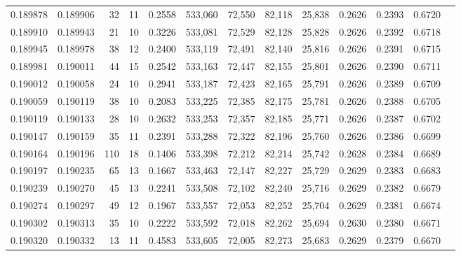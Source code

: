 \begin{tabular}{rrrrrrrrrrrrr}
0.189878 & 0.189906 &    32 &  11 &                                     0.2558 & 533,060 &  72,550 &  82,118 &  25,838 & 0.2626 & 0.2393 & 0.6720 \\
0.189910 & 0.189943 &    21 &  10 &                                     0.3226 & 533,081 &  72,529 &  82,128 &  25,828 & 0.2626 & 0.2392 & 0.6718 \\
0.189945 & 0.189978 &    38 &  12 &                                     0.2400 & 533,119 &  72,491 &  82,140 &  25,816 & 0.2626 & 0.2391 & 0.6715 \\
0.189981 & 0.190011 &    44 &  15 &                                     0.2542 & 533,163 &  72,447 &  82,155 &  25,801 & 0.2626 & 0.2390 & 0.6711 \\
0.190012 & 0.190058 &    24 &  10 &                                     0.2941 & 533,187 &  72,423 &  82,165 &  25,791 & 0.2626 & 0.2389 & 0.6709 \\
0.190059 & 0.190119 &    38 &  10 &                                     0.2083 & 533,225 &  72,385 &  82,175 &  25,781 & 0.2626 & 0.2388 & 0.6705 \\
0.190119 & 0.190133 &    28 &  10 &                                     0.2632 & 533,253 &  72,357 &  82,185 &  25,771 & 0.2626 & 0.2387 & 0.6702 \\
0.190147 & 0.190159 &    35 &  11 &                                     0.2391 & 533,288 &  72,322 &  82,196 &  25,760 & 0.2626 & 0.2386 & 0.6699 \\
0.190164 & 0.190196 &   110 &  18 &                                     0.1406 & 533,398 &  72,212 &  82,214 &  25,742 & 0.2628 & 0.2384 & 0.6689 \\
0.190197 & 0.190235 &    65 &  13 &                                     0.1667 & 533,463 &  72,147 &  82,227 &  25,729 & 0.2629 & 0.2383 & 0.6683 \\
0.190239 & 0.190270 &    45 &  13 &                                     0.2241 & 533,508 &  72,102 &  82,240 &  25,716 & 0.2629 & 0.2382 & 0.6679 \\
0.190274 & 0.190297 &    49 &  12 &                                     0.1967 & 533,557 &  72,053 &  82,252 &  25,704 & 0.2629 & 0.2381 & 0.6674 \\
0.190302 & 0.190313 &    35 &  10 &                                     0.2222 & 533,592 &  72,018 &  82,262 &  25,694 & 0.2630 & 0.2380 & 0.6671 \\
0.190320 & 0.190332 &    13 &  11 &                                     0.4583 & 533,605 &  72,005 &  82,273 &  25,683 & 0.2629 & 0.2379 & 0.6670 \\

\end{tabular}
